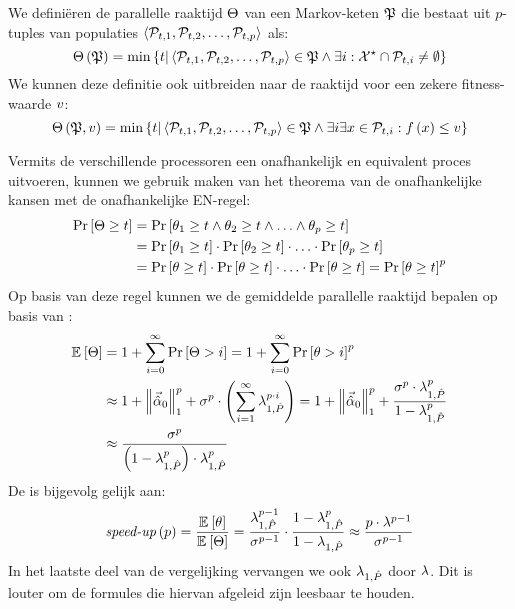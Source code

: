 \begin{definition}
We defini\"eren de parallelle raaktijd $\phittime$ van een Markov-keten $\PopChain$ die bestaat uit $p$-tuples van populaties $\tupl{\PopSet_{t,1},\PopSet_{t,2},\ldots,\PopSet_{t,p}}$ als:
\begin{equation}
\fun{\phittime}{\PopChain}=\min\accl{t|\tupl{\PopSet_{t,1},\PopSet_{t,2},\ldots,\PopSet_{t,p}}\in\PopChain\wedge\exists i:\ConfigOpSet\cap \PopSet_{t,i}\neq\emptyset}
\end{equation}
We kunnen deze definitie ook uitbreiden naar de raaktijd voor een zekere fitness-waarde $\fitnessval$:
\begin{equation}
\fun{\phittime}{\PopChain,\fitnessval}=\min\accl{t|\tupl{\PopSet_{t,1},\PopSet_{t,2},\ldots,\PopSet_{t,p}}\in\PopChain\wedge\exists i\exists \sol\in\PopSet_{t,i}:\fun{\evalfun}{\sol}\leq \fitnessval}
\end{equation}
\end{definition}
Vermits de verschillende processoren een onafhankelijk en equivalent proces uitvoeren, kunnen we gebruik maken van het theorema van de onafhankelijke kansen met de onafhankelijke EN-regel:
\begin{equation}
\begin{aligned}
\Prob{\phittime\geq t}&=\Prob{\hittime_1\geq t\wedge\hittime_2\geq t\wedge\ldots\wedge\hittime_p\geq t}\\
&=\Prob{\hittime_1\geq t}\cdot\Prob{\hittime_2\geq t}\cdot\ldots\cdot\Prob{\hittime_p\geq t}\\
&=\Prob{\hittime\geq t}\cdot\Prob{\hittime\geq t}\cdot\ldots\cdot\Prob{\hittime\geq t}=\Prob{\hittime\geq t}^p
\end{aligned}
\end{equation}
Op basis van deze regel kunnen we de gemiddelde parallelle raaktijd bepalen op basis van :
\begin{equation}
\begin{aligned}
\mean{\phittime}&=1+\displaystyle\sum_{i=0}^{\infty}{\Prob{\phittime>i}}=1+\displaystyle\sum_{i=0}^{\infty}{\Prob{\hittime>i}^p}\\
&\approx 1+\dabs[1]{\probdistnormmeta{0}}^p+\metapa^p\cdot\brak{\displaystyle\sum_{i=1}^{\infty}\ev[1,\removmat]^{p\cdot i}}=1+\dabs[1]{\probdistnormmeta{0}}^p+\displaystyle\frac{\metapa^p\cdot\ev[1,\removmat]^p}{1-\ev[1,\removmat]^p}\\
&\approx\displaystyle\frac{\metapa^p}{\brak{1-\ev[1,\removmat]^p}\cdot\ev[1,\removmat]^{p}}
\end{aligned}
\end{equation}
De \absu{} is bijgevolg gelijk aan:
\begin{equation}
\funm{\absu{}}{p}=\displaystyle\frac{\mean{\hittime}}{\mean{\phittime}}=\displaystyle\frac{\ev[1,\removmat]^{p-1}}{\metapa^{p-1}}\cdot\displaystyle\frac{1-\ev[1,\removmat]^{p}}{1-\ev[1,\removmat]}\approx\displaystyle\frac{p\cdot\metapb^{p-1}}{\metapa^{p-1}}
\eqnlab{speedupMetaheuristic}
\end{equation}
In het laatste deel van de vergelijking vervangen we ook $\ev[1,\removmat]$ door $\metapb$. Dit is louter om de formules die hiervan afgeleid zijn leesbaar te houden.

